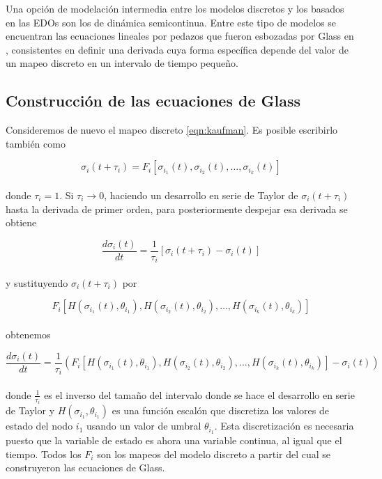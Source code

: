 Una opción de modelación intermedia entre los modelos discretos y los basados en las EDOs son los de dinámica semicontinua. Entre este tipo de modelos se encuentran las ecuaciones lineales por pedazos que fueron esbozadas por Glass en \citeauthor{Glass1973} \citep{Glass1973}, consistentes en definir una derivada cuya forma específica depende del valor de un mapeo discreto en un intervalo de tiempo pequeño. 

\subsection{Construcción de las ecuaciones de Glass}

Consideremos de nuevo el mapeo discreto \ref{eqn:kaufman}. Es posible escribirlo también como

\begin{equation}
\sigma_i(t+\tau_i)=F_i[\sigma_{i_1}(t),\sigma_{i_2}(t),\ldots,\sigma_{i_k}(t)]
\end{equation}
\\
donde $\tau_i=1$. Si $\tau_i \rightarrow 0$, haciendo un desarrollo en serie de Taylor de $\sigma_i(t+\tau_i)$ hasta la derivada de primer orden, para posteriormente despejar esa derivada se obtiene

\begin{equation}
\frac{d\sigma_i(t)}{dt} = \frac{1}{\tau_i} [\sigma_i(t+\tau_i) - \sigma_i(t)]
\end{equation}
\\
y sustituyendo $\sigma_i(t+\tau_i)$ por 

\begin{equation}
F_i[H(\sigma_{i_1}(t), \theta_{i_1}), H(\sigma_{i_2}(t), \theta_{i_2}),\ldots, H(\sigma_{i_k}(t), \theta_{i_k})]
\end{equation}
\\
obtenemos 

\begin{equation}
\frac{d\sigma_i(t)}{dt} = \frac{1}{\tau_i} (F_i[H(\sigma_{i_1}(t), \theta_{i_1}), H(\sigma_{i_2}(t), \theta_{i_2}),\ldots, H(\sigma_{i_k}(t), \theta_{i_k})] - \sigma_i(t))
\end{equation} 
\\
donde $\frac{1}{\tau_i}$ es el inverso del tamaño del intervalo donde se hace el desarrollo en serie de Taylor y $H(\sigma_{i_1}, \theta_{i_1})$ es una función escalón que discretiza los valores de estado del nodo $i_1$ usando un valor de umbral $\theta_{i_1}$. Esta discretización es necesaria puesto que la variable de estado es ahora una variable continua, al igual que el tiempo. Todos los $F_i$ son los mapeos del modelo discreto a partir del cual se construyeron las ecuaciones de Glass.

